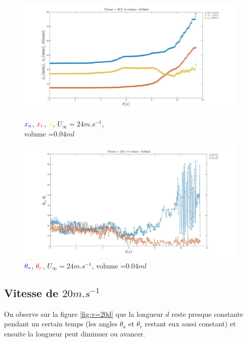 \newpage
\begin{figure}[!ht]
	\centering
	\begin{minipage}{0.7\linewidth}
		\includegraphics[width=\linewidth]{./gfx/v=24_vol=004_xaxrd.jpg}
		\caption{$\textcolor{blue}{x_{a}}$,
		$\textcolor{red}{x_{r}}$, $\textcolor{yellow}{d}$, 
		$U_{\infty}=24m.s^{-1}$, \\
                volume =$0.04ml$}
		\label{fig:entre_xaxrd}
	\end{minipage}
	\vfill
	\begin{minipage}{0.7\linewidth}
		\includegraphics[width=\linewidth]{./gfx/v=24_vol=004_oaor.jpg}
		\caption{$\textcolor{blue}{\theta_{a}}$,
		$\textcolor{red}{\theta_{r}}$, $U_{\infty}=24m.s^{-1}$, volume =$0.04ml$}
		\label{fig:entre_oaor}
	\end{minipage}
 \end{figure}


\newpage
\subsection{Vitesse de $20m.s^{-1}$}

On observe sur la figure \ref{fig:v=20d} que la longueur $d$ reste presque constante pendant un certain temps (les angles $\theta_{a}$ et $\theta_{r}$ restant eux aussi constant) et ensuite la longueur peut diminuer ou avancer.\\

